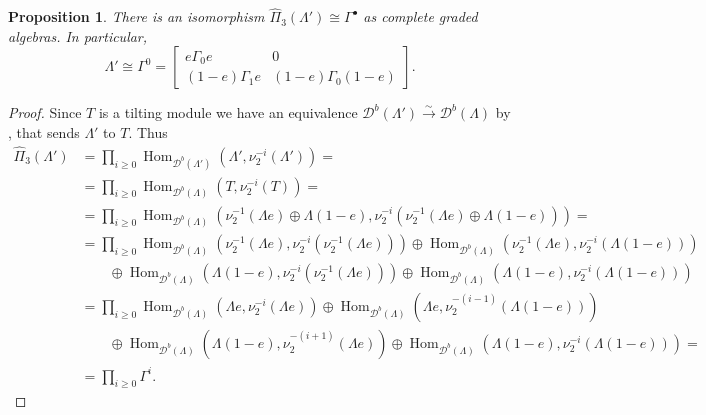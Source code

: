 \documentclass[a4paper, reqno]{amsart}
\newtheorem{myprop}[mythm]{Proposition}
\theoremstyle{definition}
\DeclareMathOperator{\Hom}{\mathrm{Hom}}
\begin{document}
\begin{myprop}\label{proposition - degree shift for preprojective}
	There is an isomorphism $\widehat{\Pi}_3(\Lambda')\cong \Gamma^\bullet$ as complete graded algebras. In particular,
	\begin{equation*}
		\Lambda' \cong \Gamma^0 = \begin{bmatrix}
			e\Gamma_0 e & 0 \\
			(1- e)\Gamma_1 e & (1-e)\Gamma_0 (1-e)
		\end{bmatrix}.
	\end{equation*}
\end{myprop}

\begin{proof}
	Since $T$ is a tilting module we have an equivalence $\mathcal{D}^b(\Lambda')\xrightarrow{\sim}\mathcal{D}^b(\Lambda)$ by \cite[Theorem 1.6]{Happel1987}, that sends $\Lambda'$ to $T$. Thus
	\begin{equation*}
		\begin{aligned}
			\widehat{\Pi}_3(\Lambda') &= \prod_{i\ge 0} \Hom_{\mathcal{D}^b(\Lambda')}(\Lambda', \nu_2^{-i}(\Lambda')) = \\
			&= \prod_{i\ge 0} \Hom_{\mathcal{D}^b(\Lambda)}(T, \nu_2^{-i}(T)) = \\
			&= \prod_{i\ge 0} \Hom_{\mathcal{D}^b(\Lambda)}(\nu_2^{-1}(\Lambda e)\oplus \Lambda(1- e), \nu_2^{-i}(\nu_2^{-1}(\Lambda e)\oplus \Lambda(1- e))) = \\
			&= \prod_{i\ge 0} \Hom_{\mathcal{D}^b(\Lambda)}(\nu_2^{-1}(\Lambda e), \nu_2^{-i}(\nu_2^{-1}(\Lambda e))) \oplus \Hom_{\mathcal{D}^b(\Lambda)}(\nu_2^{-1}(\Lambda e), \nu_2^{-i}(\Lambda(1- e))) \\
			&\qquad \oplus \Hom_{\mathcal{D}^b(\Lambda)}(\Lambda(1- e), \nu_2^{-i}(\nu_2^{-1}(\Lambda e))) \oplus \Hom_{\mathcal{D}^b(\Lambda)}(\Lambda(1- e), \nu_2^{-i}(\Lambda(1- e))) \\
			&= \prod_{i\ge 0} \Hom_{\mathcal{D}^b(\Lambda)}(\Lambda e, \nu_2^{-i}(\Lambda e)) \oplus \Hom_{\mathcal{D}^b(\Lambda)}(\Lambda e, \nu_2^{-(i-1)}(\Lambda(1- e))) \\
			&\qquad \oplus \Hom_{\mathcal{D}^b(\Lambda)}(\Lambda(1- e), \nu_2^{-(i+1)}(\Lambda e)) \oplus \Hom_{\mathcal{D}^b(\Lambda)}(\Lambda(1- e), \nu_2^{-i}(\Lambda(1- e))) = \\
			&= \prod_{i\ge 0}\Gamma^i.
		\end{aligned}
	\end{equation*}
\end{proof}
\end{document}
